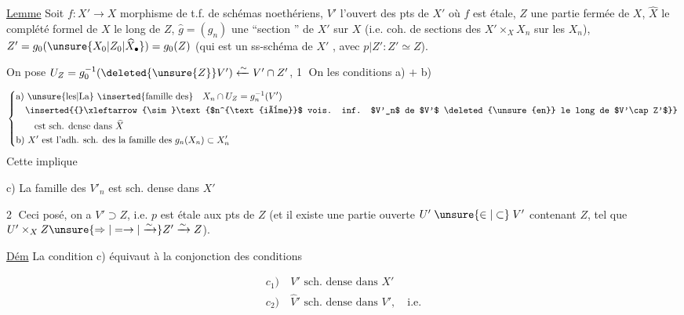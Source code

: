 \uline{Lemme} Soit $f:X'\longrightarrow X$ morphisme  de t.f.  de schémas noethériens, $V'$ l'ouvert des pts de $X'$ où $f$ est étale, $Z$ une partie fermée de $X$, $\widehat X$ le complété formel de $X$ le long de $Z$, $\widehat g=(g_n)$ une ``section '' de $X'$ sur $X$ (i.e.   coh. de sections des $X'\mathbin{\times}_X X_n$ sur les $X_n$), $Z'=g_0(\unsure{X_0|Z_0|\widehat X_\bullet})=g_0(Z)$ (qui est un ss-schéma  de $X'$ , avec $p|Z': Z'\simeq Z$).

 On pose $U_Z=g_0^{-1}(\deleted{\unsure{Z}}V')\xleftarrow{\sim}V'\cap Z'$, \textcircled{1}  On    les conditions a) $+$ b)

\[
\left\{\begin{aligned}
&\text{a) \unsure{les|La} \inserted{famille des}}\quad X_n\cap U_Z=g_n^{-1}(V')\\
&\quad\inserted{{}\xleftarrow{\sim}\text{$n^{\text{ième}}$ vois. inf. $V'_n$ de $V'$ \deleted{\unsure{en}} le long de $V'\cap Z'$}}\\
&\qquad\text{est sch. dense dans }\widehat X\\
&\text{b) }X'\text{ est l'adh. sch. des la famille des }g_n(X_n)\subset X'_n
\end{aligned}\right.
\]
Cette   implique 

c) La famille des $V'_n$  est sch. dense dans $X'$

\textcircled{2} Ceci posé,   on a $V'\supset Z$, i.e. $p$ est étale aux pts de $Z$ (et il existe  une partie ouverte $U'\mathrel{\unsure{\in|\subset}}V'$ contenant $Z$, tel que $U'\mathbin{\times}_X Z\unsure{\Rightarrow|=\rightarrow|\xrightarrow{\sim}}Z'\xrightarrow{\sim}Z$).

\uline{Dém}  La condition c) équivaut à la conjonction des conditions

\[
\begin{aligned}
c_1)&\ V'\text{ sch. dense dans }X'\\
c_2)&\ \widehat V'\text{ sch. dense dans }V',\quad\text{i.e.}
\end{aligned}
\]
